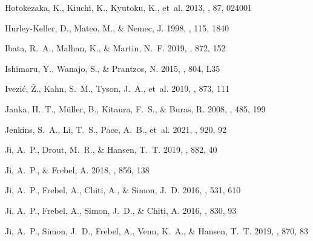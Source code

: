 \documentclass[letterpaper]{article}
\begin{document}
\begin{thebibliography}{}
{Hotokezaka}, K., {Kiuchi}, K., {Kyutoku}, K., {et~al.} 2013, \prd, 87, 024001

{Hurley-Keller}, D., {Mateo}, M., \& {Nemec}, J. 1998, \aj, 115, 1840

{Ibata}, R.~A., {Malhan}, K., \& {Martin}, N.~F. 2019, \apj, 872, 152

{Ishimaru}, Y., {Wanajo}, S., \& {Prantzos}, N. 2015, \apjl, 804, L35

{Ivezi{\'c}}, {\v{Z}}., {Kahn}, S.~M., {Tyson}, J.~A., {et~al.} 2019, \apj,
  873, 111

{Janka}, H.~T., {M{\"u}ller}, B., {Kitaura}, F.~S., \& {Buras}, R. 2008, \aap,
  485, 199

{Jenkins}, S.~A., {Li}, T.~S., {Pace}, A.~B., {et~al.} 2021, \apj, 920, 92

{Ji}, A.~P., {Drout}, M.~R., \& {Hansen}, T.~T. 2019{}, \apj, 882,
  40

{Ji}, A.~P., \& {Frebel}, A. 2018, \apj, 856, 138

{Ji}, A.~P., {Frebel}, A., {Chiti}, A., \& {Simon}, J.~D. 2016{},
  \nat, 531, 610

{Ji}, A.~P., {Frebel}, A., {Simon}, J.~D., \& {Chiti}, A. 2016{},
  \apj, 830, 93

{Ji}, A.~P., {Simon}, J.~D., {Frebel}, A., {Venn}, K.~A., \& {Hansen}, T.~T.
  2019{}, \apj, 870, 83


\end{thebibliography}
\end{document}
